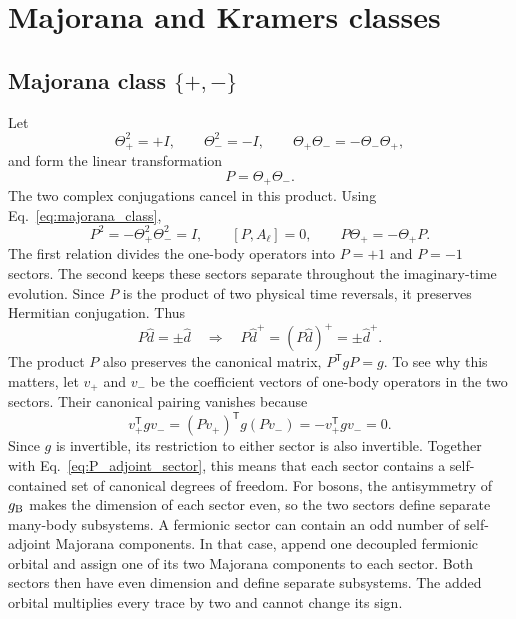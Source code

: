 \documentclass[onecolumn,aps,prb,amsmath,amssymb,superscriptaddress,longbibliography]{revtex4-2}
\newcommand{\trans}{\mathsf{T}}
\begin{document}
\section{Majorana and Kramers classes}

\subsection{Majorana class \texorpdfstring{\(\{+,-\}\)}{\{+,-\}}}

Let
\begin{equation}
    \Theta_+^2=+I,
    \qquad
    \Theta_-^2=-I,
    \qquad
    \Theta_+\Theta_-=-\Theta_-\Theta_+,
    \label{eq:majorana_class}
\end{equation}
and form the linear transformation
\begin{equation}
    P=\Theta_+\Theta_-.
    \label{eq:P_definition}
\end{equation}
The two complex conjugations cancel in this product.  Using Eq.~\eqref{eq:majorana_class},
\begin{equation}
    P^2=-\Theta_+^2\Theta_-^2=I,
    \qquad
    [P,A_\ell]=0,
    \qquad
    P\Theta_+=-\Theta_+P.
    \label{eq:P_properties}
\end{equation}
The first relation divides the one-body operators into \(P=+1\) and \(P=-1\) sectors.  The second keeps these sectors separate throughout the imaginary-time evolution.  Since \(P\) is the product of two physical time reversals, it preserves Hermitian conjugation.  Thus
\begin{equation}
    P\hat d=\pm\hat d
    \quad\Longrightarrow\quad
    P\hat d^+=(P\hat d)^+=\pm\hat d^+.
    \label{eq:P_adjoint_sector}
\end{equation}
The product \(P\) also preserves the canonical matrix, \(P^\trans gP=g\).  To see why this matters, let \(v_+\) and \(v_-\) be the coefficient vectors of one-body operators in the two sectors.  Their canonical pairing vanishes because
\begin{equation}
    v_+^\trans gv_-
    =(Pv_+)^\trans g(Pv_-)
    =-v_+^\trans gv_-
    =0.
    \label{eq:P_sector_canonical_pairing}
\end{equation}
Since \(g\) is invertible, its restriction to either sector is also invertible.  Together with Eq.~\eqref{eq:P_adjoint_sector}, this means that each sector contains a self-contained set of canonical degrees of freedom.  For bosons, the antisymmetry of \(g_{\rm B}\) makes the dimension of each sector even, so the two sectors define separate many-body subsystems.  A fermionic sector can contain an odd number of self-adjoint Majorana components.  In that case, append one decoupled fermionic orbital and assign one of its two Majorana components to each sector.  Both sectors then have even dimension and define separate subsystems.  The added orbital multiplies every trace by two and cannot change its sign.
\end{document}
